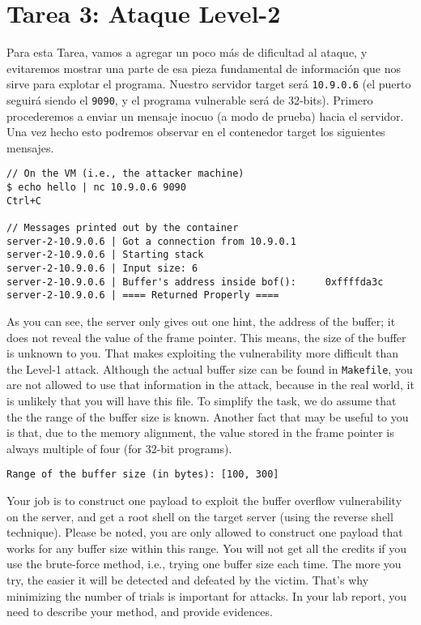 \section{Tarea 3: Ataque Level-2} 

Para esta Tarea, vamos a agregar un poco más de dificultad al ataque, y evitaremos mostrar una parte de esa pieza fundamental de información que nos sirve para explotar el programa. Nuestro servidor target será \texttt{10.9.0.6} (el puerto seguirá siendo el \texttt{9090}, y el programa vulnerable será de 32-bits). 
Primero procederemos a enviar un mensaje inocuo (a modo de prueba) hacia el servidor.
Una vez hecho esto podremos observar en el contenedor target los siguientes mensajes.

\begin{lstlisting}
// On the VM (i.e., the attacker machine)
$ echo hello | nc 10.9.0.6 9090
Ctrl+C

// Messages printed out by the container
server-2-10.9.0.6 | Got a connection from 10.9.0.1
server-2-10.9.0.6 | Starting stack
server-2-10.9.0.6 | Input size: 6
server-2-10.9.0.6 | Buffer's address inside bof():     0xffffda3c
server-2-10.9.0.6 | ==== Returned Properly ====
\end{lstlisting}
 
As you can see, the server only gives out one hint, the 
address of the buffer; it does not reveal the value of the 
frame pointer. This means, the size of the buffer is unknown
to you. That makes exploiting the vulnerability more 
difficult than the Level-1 attack. 
Although the actual buffer size can be found in 
\texttt{Makefile}, you are not allowed to use that 
information in the attack, because in the real world, it is 
unlikely that you will have this file. 
To simplify the task, we do assume that the
the range of the buffer size is known.
Another fact that
may be useful to you is that, due to the memory alignment,
the value stored in the
frame pointer is always multiple of four (for 32-bit programs).


\begin{lstlisting}
Range of the buffer size (in bytes): [100, 300]
\end{lstlisting}
 

Your job is to construct one payload to exploit the buffer overflow
vulnerability on the server, and get a root shell on the target server (using
the reverse shell technique). Please be noted, you are only allowed 
to construct one payload that works for any buffer size 
within this range.  You will not get all the credits if you 
use the brute-force method, i.e., trying one buffer size
each time. The more you try, the easier it will be detected 
and defeated by the victim. That's why minimizing the number 
of trials is important for attacks. 
In your lab report, you need to describe your method, 
and provide evidences.



